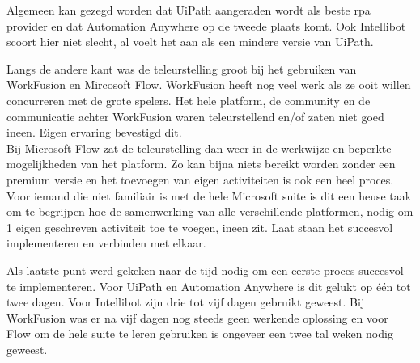 Algemeen kan gezegd worden dat UiPath aangeraden wordt als beste \acrshort{rpa} provider en dat Automation Anywhere op de tweede plaats komt. Ook Intellibot scoort hier niet slecht, al voelt het aan als een mindere versie van UiPath.

Langs de andere kant was de teleurstelling groot bij het gebruiken van WorkFusion en Mircosoft Flow. WorkFusion heeft nog veel werk als ze ooit willen concurreren met de grote spelers. Het hele platform, de community en de communicatie achter WorkFusion waren teleurstellend en/of zaten niet goed ineen. Eigen ervaring bevestigd dit.\\
Bij Microsoft Flow zat de teleurstelling dan weer in de werkwijze en beperkte mogelijkheden van het platform. Zo kan bijna niets bereikt worden zonder een premium versie en het toevoegen van eigen activiteiten is ook een heel proces. Voor iemand die niet familiair is met de hele Microsoft suite is dit een heuse taak om te begrijpen hoe de samenwerking van alle verschillende platformen, nodig om 1 eigen geschreven activiteit toe te voegen, ineen zit. Laat staan het succesvol implementeren en verbinden met elkaar.

Als laatste punt werd gekeken naar de tijd nodig om een eerste proces succesvol te implementeren. Voor UiPath en Automation Anywhere is dit gelukt op één tot twee dagen. Voor Intellibot zijn drie tot vijf dagen gebruikt geweest. Bij WorkFusion was er na vijf dagen nog steeds geen werkende oplossing en voor Flow om de hele suite te leren gebruiken is ongeveer een twee tal weken nodig geweest.